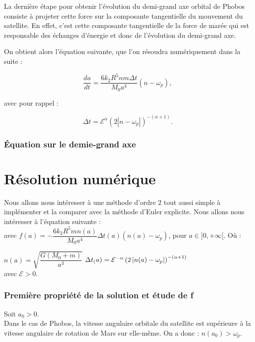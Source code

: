 \documentclass[12pt,a4paper]{article}
\begin{document}
	
	La dernière étape pour obtenir l’évolution du demi-grand axe orbital de Phobos consiste à projeter cette force sur la composante tangentielle du mouvement du satellite. En effet, c’est cette composante tangentielle de la force de marée qui est responsable des échanges d’énergie et donc de l’évolution du demi-grand axe. 
	
	
	On obtient alors l’équation suivante, que l’on résoudra numériquement dans la suite :
	
	\[
	\frac{da}{dt}
	=
	\frac{6k_2R^5nm\Delta t}{M_0a^4}(n-\omega_p),
	\]
	
	avec pour rappel :
	
	\[
	\Delta t
	=
	\mathcal{E}^{\alpha}
	\left(2|n-\omega_p|\right)^{-(\alpha+1)}.
	\]
	
	\section{Équation sur le demie-grand axe}
	
	\newpage
	
	\part{Résolution numérique}
    \setcounter{section}{0}

    Nous allons nous intéresser à une méthode d'ordre 2 tout aussi simple à implémenter et la comparer avec la méthode d'Euler explicite.
	Nous allons nous intéresser à l'équation suivante : \\
	
	avec $f(a) = -\dfrac{6k_2R^5mn(a)}{M_0a^4}\Delta t(a)(n(a)-\omega_p)$, pour $a \in ]0,+\infty[$. Où :
	\begin{center}
		$n(a) = \sqrt{\dfrac{G(M_0+m)}{a^3}}$ \hspace{2cm} $\Delta t_(a) = \mathcal E^{-\alpha}\left(2\left\lvert n(a)-\omega_p \right\rvert\right)^{-(\alpha+1)}$\\
		
		avec $\mathcal E > 0$.
	\end{center}
	
	\section{Première propriété de la solution et étude de f}
	
	Soit $a_0 > 0$.\\
    Dans le cas de Phobos, la vitesse angulaire orbitale du satellite est supérieure à la vitesse angulaire de rotation de Mars sur elle-même. On a donc : $n(a_0) > \omega_p$.
	
\end{document}
